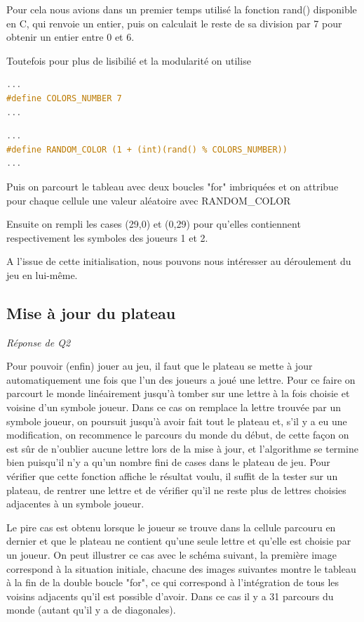\documentclass[a4paper,11pt]{article}
\begin{document}
Pour cela nous avions dans un premier temps  utilisé la fonction rand() disponible en C, qui renvoie un entier, puis on calculait le reste de sa division par 7 pour obtenir un entier entre 0 et 6. 

Toutefois pour plus de lisibilié et la modularité on utilise 
\begin{lstlisting}[language=C, caption=parameters.h]
...
#define COLORS_NUMBER 7
...
\end{lstlisting}

\begin{lstlisting}[language=C, caption=board.h]
...
#define RANDOM_COLOR (1 + (int)(rand() % COLORS_NUMBER))
...
\end{lstlisting}

Puis on parcourt le tableau avec deux boucles "for" imbriquées et on attribue pour chaque cellule une valeur aléatoire avec RANDOM\_COLOR

Ensuite on rempli les cases (29,0) et (0,29) pour qu'elles contiennent respectivement les symboles des joueurs 1 et 2.

A l'issue de cette initialisation, nous pouvons nous intéresser au déroulement du jeu en lui-même.

\subsection{Mise à jour du plateau}
\emph{Réponse de Q2}

Pour pouvoir (enfin) jouer au jeu, il faut que le plateau se mette à jour automatiquement une fois que l'un des joueurs a joué une lettre. Pour ce faire on parcourt le monde linéairement jusqu'à tomber sur une lettre à la fois choisie et voisine d'un symbole joueur. Dans ce cas on remplace la lettre trouvée par un symbole joueur, on poursuit jusqu'à avoir fait tout le plateau et, s'il y a eu une modification, on recommence le parcours du monde du début, de cette façon on est sûr de n'oublier aucune lettre lors de la mise à jour, et l'algorithme se termine bien puisqu'il n'y a qu'un nombre fini de cases dans le plateau de jeu. Pour vérifier que cette fonction affiche le résultat voulu, il suffit de la tester sur un plateau, de rentrer une lettre et de vérifier qu'il ne reste plus de lettres choisies adjacentes à un symbole joueur. 

Le pire cas est obtenu lorsque le joueur se trouve dans la cellule parcouru en dernier et que le plateau ne contient qu'une seule lettre et qu'elle est choisie par un joueur. On peut illustrer ce cas avec le schéma suivant, la première image correspond à la situation initiale, chacune des images suivantes montre le tableau à la fin de la double boucle "for", ce qui correspond à l'intégration de tous les voisins adjacents qu'il est possible d'avoir. Dans ce cas il y a 31 parcours du monde (autant qu'il y a de diagonales).
\end{document}
